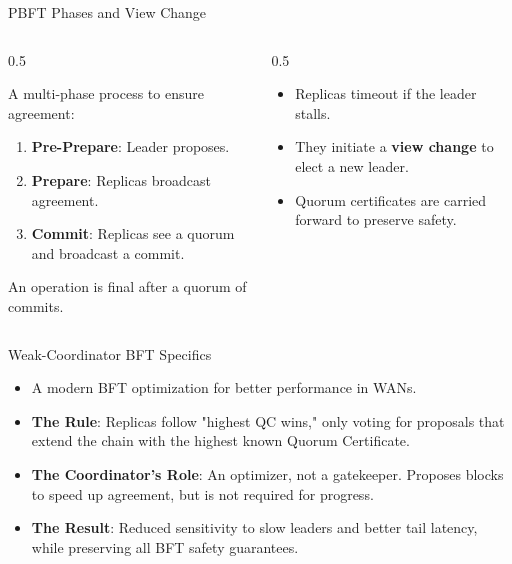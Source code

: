\documentclass[aspectratio=169]{beamer}
\begin{document}
\begin{frame}{PBFT Phases and View Change}
    \begin{columns}[T]
        \begin{column}{0.5\linewidth}
            \begin{tcolorbox}[enhanced, colback=d2s.fg!30, colframe=black, fonttitle=\bfseries, title={Normal Case Operation \cite{castro_practical_1999}}, rounded corners, drop shadow]
            A multi-phase process to ensure agreement:
            \begin{enumerate}
                \item \textbf{Pre-Prepare}: Leader proposes.
                \item \textbf{Prepare}: Replicas broadcast agreement.
                \item \textbf{Commit}: Replicas see a quorum and broadcast a commit.
            \end{enumerate}
            An operation is final after a quorum of commits.
            \end{tcolorbox}
        \end{column}
        \begin{column}{0.5\linewidth}
            \begin{tcolorbox}[enhanced, colback=d2s.fg!30, colframe=black, fonttitle=\bfseries, title={View Change (Failure Case)}, rounded corners, drop shadow]
            \begin{itemize}
                \item Replicas timeout if the leader stalls.
                \item They initiate a \textbf{view change} to elect a new leader.
                \item Quorum certificates are carried forward to preserve safety.
            \end{itemize}
            \end{tcolorbox}
        \end{column}
    \end{columns}
\end{frame}

\begin{frame}{Weak-Coordinator BFT Specifics}
    \begin{itemize}
        \item A modern BFT optimization for better performance in WANs.
        \item \textbf{The Rule}: Replicas follow "highest QC wins," only voting for proposals that extend the chain with the highest known Quorum Certificate.
        \item \textbf{The Coordinator's Role}: An optimizer, not a gatekeeper. Proposes blocks to speed up agreement, but is not required for progress.
        \item \textbf{The Result}: Reduced sensitivity to slow leaders and better tail latency, while preserving all BFT safety guarantees.
    \end{itemize}
\end{frame}
\end{document}
